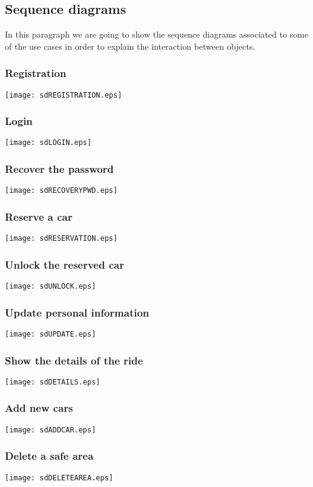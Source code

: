 \pagebreak
\subsection{Sequence diagrams}
In this paragraph we are going to show the sequence diagrams associated to some of the use cases in order to explain the interaction between objects.

\subsubsection{Registration}
	\centerline{
		\texttt{[image: sdREGISTRATION.eps]}}
	\pagebreak

\subsubsection{Login}
	\centerline{
		\texttt{[image: sdLOGIN.eps]}}
	\pagebreak

\subsubsection{Recover the password}
	\centerline{
		\texttt{[image: sdRECOVERYPWD.eps]}}
	\pagebreak
	
\subsubsection{Reserve a car}
	\centerline{
		\texttt{[image: sdRESERVATION.eps]}}
	\pagebreak
	
\subsubsection{Unlock the reserved car}
	\centerline{
		\texttt{[image: sdUNLOCK.eps]}}
		\pagebreak

\subsubsection{Update personal information}
	\centerline{
		\texttt{[image: sdUPDATE.eps]}}
	\pagebreak
	
\subsubsection{Show the details of the ride}
	\centerline{
		\texttt{[image: sdDETAILS.eps]}}
	
\subsubsection{Add new cars}
	\centerline{
		\texttt{[image: sdADDCAR.eps]}}

\subsubsection{Delete a safe area}
	\centerline{
		\texttt{[image: sdDELETEAREA.eps]}}
